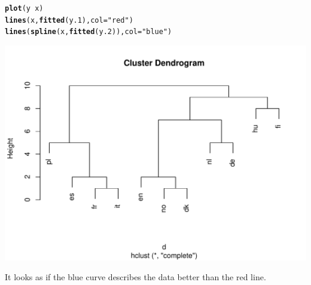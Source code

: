 \documentclass{article}\usepackage[]{graphicx}\usepackage[]{color}
\makeatletter
\def\maxwidth{ %
  \ifdim\Gin@nat@width>\linewidth
    \linewidth
  \else
    \Gin@nat@width
  \fi
}
\newcommand{\hlstr}[1]{\textcolor[rgb]{0.192,0.494,0.8}{#1}}%
\newcommand{\hlopt}[1]{\textcolor[rgb]{0,0,0}{#1}}%
\newcommand{\hlstd}[1]{\textcolor[rgb]{0.345,0.345,0.345}{#1}}%
\newcommand{\hlkwc}[1]{\textcolor[rgb]{0.333,0.667,0.333}{#1}}%
\newcommand{\hlkwd}[1]{\textcolor[rgb]{0.737,0.353,0.396}{\textbf{#1}}}%
\newenvironment{kframe}{%
 \def\at@end@of@kframe{}%
 \ifinner\ifhmode%
  \def\at@end@of@kframe{\end{minipage}}%
  \begin{minipage}{\columnwidth}%
 \fi\fi%
 \def\FrameCommand##1{\hskip\@totalleftmargin \hskip-\fboxsep
 \colorbox{shadecolor}{##1}\hskip-\fboxsep
     \hskip-\linewidth \hskip-\@totalleftmargin \hskip\columnwidth}%
 \MakeFramed {\advance\hsize-\width
   \@totalleftmargin\z@ \linewidth\hsize
   \@setminipage}}%
 {\par\unskip\endMakeFramed%
 \at@end@of@kframe}
\newenvironment{knitrout}{}{} %
\makeatother
\begin{document}
\begin{knitrout}
\color{fgcolor}\begin{kframe}
\begin{alltt}
\hlkwd{plot}\hlstd{(y} \hlopt{~} \hlstd{x)}
\hlkwd{lines}\hlstd{(x,} \hlkwd{fitted}\hlstd{(y.1),} \hlkwc{col} \hlstd{=} \hlstr{"red"}\hlstd{)}
\hlkwd{lines}\hlstd{(}\hlkwd{spline}\hlstd{(x,} \hlkwd{fitted}\hlstd{(y.2)),} \hlkwc{col} \hlstd{=} \hlstr{"blue"}\hlstd{)}
\end{alltt}
\end{kframe}
\includegraphics[width=\maxwidth]{figure/unnamed-chunk-8} 

\end{knitrout}


It looks as if the blue curve describes the data better than the red line.
\end{document}
